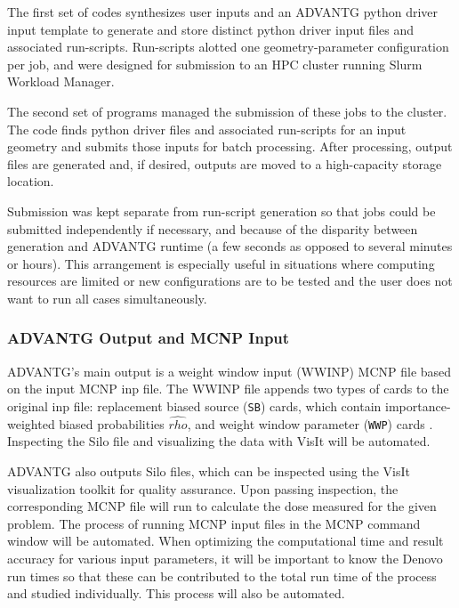 \documentclass[10pt]{article}
\begin{document}
The first set of codes synthesizes user inputs and an ADVANTG python driver input template to generate and store distinct python driver input files and associated run-scripts.  Run-scripts alotted one geometry-parameter configuration per job, and were designed for submission to an HPC cluster running Slurm Workload Manager.

The second set of programs managed the submission of these jobs to the cluster. The code finds python driver files and associated run-scripts for an input geometry and submits those inputs for batch processing. After processing, output files are generated and, if desired, outputs are moved to a high-capacity storage location.

Submission was kept separate from run-script generation so that jobs could be submitted independently if necessary, and because of the disparity between generation and ADVANTG runtime (a few seconds as opposed to several minutes or hours). This arrangement is especially useful in situations where computing resources are limited or new configurations are to be tested and the user does not want to run all cases simultaneously. 


\subsubsection{ADVANTG Output and MCNP Input}
\label{sec:alg:advantg-out}

ADVANTG's main output is a weight window input (WWINP) MCNP file based on the input MCNP inp file.
The WWINP file appends two types of cards to the original inp file: replacement biased source (\texttt{SB}) cards, which contain importance-weighted biased probabilities $\hat{rho}$, and weight window parameter (\texttt{WWP}) cards \cite{software:advantg}.
Inspecting the Silo file and visualizing the data with VisIt will be automated.

ADVANTG also outputs Silo files, which can be inspected using the VisIt visualization toolkit \cite{HPV:VisIt} for quality assurance.
Upon passing inspection, the corresponding MCNP file will run to calculate the dose measured for the given problem.
The process of running MCNP input files in the MCNP command window will be automated.
When optimizing the computational time and result accuracy for various input parameters, it will be important to know the Denovo run times so that these can be contributed to the total run time of the process and studied individually.
This process will also be automated.
\end{document}
